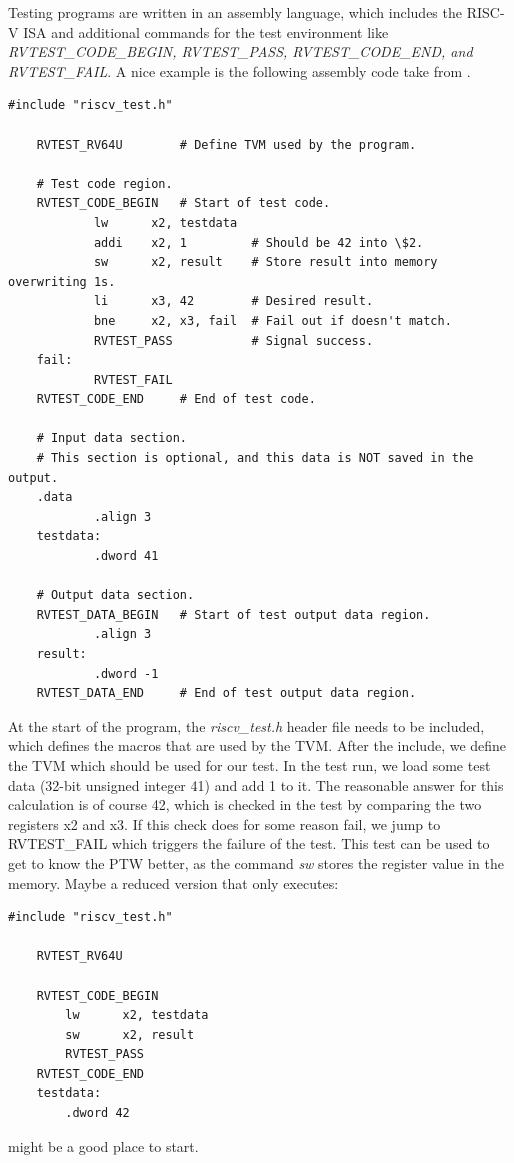 \cite{github_riscv-tests} \newline
Testing programs are written in an assembly language, which includes the RISC-V ISA
and additional commands for the test environment like
\textit{RVTEST\_CODE\_BEGIN, RVTEST\_PASS, RVTEST\_CODE\_END, and RVTEST\_FAIL}.
A nice example is the following assembly code take from \cite{github_riscv-tests}.
\begin{lstlisting}[frame=single]
    #include "riscv_test.h"

    RVTEST_RV64U        # Define TVM used by the program.
    
    # Test code region.
    RVTEST_CODE_BEGIN   # Start of test code.
            lw      x2, testdata
            addi    x2, 1         # Should be 42 into \$2.
            sw      x2, result    # Store result into memory overwriting 1s.
            li      x3, 42        # Desired result.
            bne     x2, x3, fail  # Fail out if doesn't match.
            RVTEST_PASS           # Signal success.
    fail:
            RVTEST_FAIL
    RVTEST_CODE_END     # End of test code.
    
    # Input data section.
    # This section is optional, and this data is NOT saved in the output.
    .data
            .align 3
    testdata:
            .dword 41
    
    # Output data section.
    RVTEST_DATA_BEGIN   # Start of test output data region.
            .align 3
    result:
            .dword -1
    RVTEST_DATA_END     # End of test output data region.
\end{lstlisting}
At the start of the program, the \textit{riscv\_test.h} header file needs
to be included, which defines the macros that are used by the TVM.
After the include, we define the TVM which should be used for our test.
In the test run, we load some test data (32-bit unsigned integer 41) and
add 1 to it. The reasonable answer for this calculation is of course 42, which is
checked in the test by comparing the two registers x2 and x3.
If this check does for some reason fail, we jump to RVTEST\_FAIL which triggers
the failure of the test.
This test can be used to get to know the PTW better, as the command \textit{sw}
stores the register value in the memory.
Maybe a reduced version that only executes:
\begin{lstlisting}[frame=single]
    #include "riscv_test.h"
    
    RVTEST_RV64U
    
    RVTEST_CODE_BEGIN
        lw      x2, testdata
        sw      x2, result
        RVTEST_PASS
    RVTEST_CODE_END
    testdata:
        .dword 42
\end{lstlisting}
might be a good place to start.
